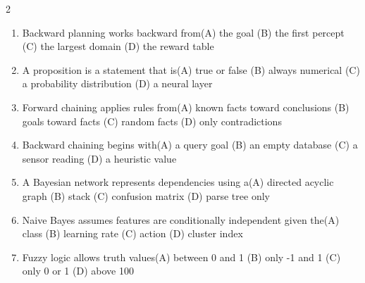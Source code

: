 \documentclass[a4paper]{article}
\begin{document}
\begin{multicols*}{2}
\begin{enumerate}
\item Backward planning works backward from\newline\hspace*{0.6em}(A) the goal \quad (B) the first percept \newline\hspace*{0.6em}(C) the largest domain \quad (D) the reward table
\item A proposition is a statement that is\newline\hspace*{0.6em}(A) true or false \quad (B) always numerical \newline\hspace*{0.6em}(C) a probability distribution \quad (D) a neural layer
\item Forward chaining applies rules from\newline\hspace*{0.6em}(A) known facts toward conclusions \quad (B) goals toward facts \newline\hspace*{0.6em}(C) random facts \quad (D) only contradictions
\item Backward chaining begins with\newline\hspace*{0.6em}(A) a query goal \quad (B) an empty database \newline\hspace*{0.6em}(C) a sensor reading \quad (D) a heuristic value
\item A Bayesian network represents dependencies using a\newline\hspace*{0.6em}(A) directed acyclic graph \quad (B) stack \newline\hspace*{0.6em}(C) confusion matrix \quad (D) parse tree only
\item Naive Bayes assumes features are conditionally independent given the\newline\hspace*{0.6em}(A) class \quad (B) learning rate \newline\hspace*{0.6em}(C) action \quad (D) cluster index
\item Fuzzy logic allows truth values\newline\hspace*{0.6em}(A) between 0 and 1 \quad (B) only -1 and 1 \newline\hspace*{0.6em}(C) only 0 or 1 \quad (D) above 100

\end{enumerate}
\end{multicols*}
\end{document}
